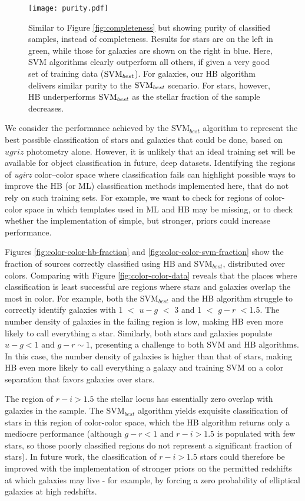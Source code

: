 \documentclass[12pt,preprint]{aastex}
\begin{document}
\begin{figure}
\centering
\texttt{[image: purity.pdf]}
\caption{Similar to Figure \ref{fig:completeness} but showing purity
  of classified samples, instead of completeness. Results for stars are on the left in green, while those for galaxies are shown on the right in blue.  Here, SVM algorithms 
  clearly outperform all others, if given a very good set of training
  data (${\rm SVM}_{best}$).  For galaxies, our HB algorithm delivers
  similar purity to the ${\rm SVM}_{best}$ scenario.  For stars,
  however, HB underperforms ${\rm SVM}_{best}$ as the stellar fraction
  of the sample decreases.}
\label{fig:purity}
\end{figure}

We consider the performance achieved by the SVM$_{best}$ algorithm to represent the best possible classification of stars and galaxies that could be done, based on $ugriz$ photometry alone.   However, it is unlikely that an ideal training set will be available for object classification in future, deep datasets.  Identifying the regions of {\it ugirz} color--color
space where classification fails can highlight possible ways to improve the HB (or ML) classification methods implemented here, that do not rely on such training sets.  For example, we want to check for regions of color-color space in which templates used in ML and HB may be missing, or to check whether the implementation of simple, but stronger, priors could increase performance.   

Figures
\ref{fig:color-color-hb-fraction} and \ref{fig:color-color-svm-fraction} show the fraction of sources
correctly classified using HB and SVM$_{best}$, distributed over
colors.  Comparing with Figure \ref{fig:color-color-data} reveals that the places where classification is least successful
are regions where stars and galaxies overlap the most in color.  For example, both the SVM$_{best}$ and the HB algorithm struggle to correctly identify galaxies with 1 $<$ $u-g$ $<$ 3 and 1 $<$ $g-r$ $<$1.5.  The number density of galaxies in the failing region is low, making HB even more likely to call everything a star.  Similarly, both stars and galaxies populate $u-g < 1$ and $g-r \sim 1$, presenting a challenge to both SVM and HB algorithms.  In this case, the number density of galaxies is higher than that of stars, making HB even more likely to call everything a galaxy and training SVM on a color separation that favors galaxies over stars.  

The region of $r-i>1.5$ the stellar locus has essentially zero overlap with galaxies in the sample.  The SVM$_{best}$ algorithm yields exquisite classification of stars in this region of color-color space, which the HB algorithm returns only a mediocre performance (although $g-r < 1$ and $r-i > 1.5$ is populated with few stars, so those poorly classified regions do not represent a significant fraction of stars).  In future work, the classification of $r-i > 1.5$ stars could therefore be improved with the implementation of stronger priors on the permitted redshifts at which galaxies may live - for example, by forcing a zero probability of elliptical galaxies at high redshifts.
\end{document}
